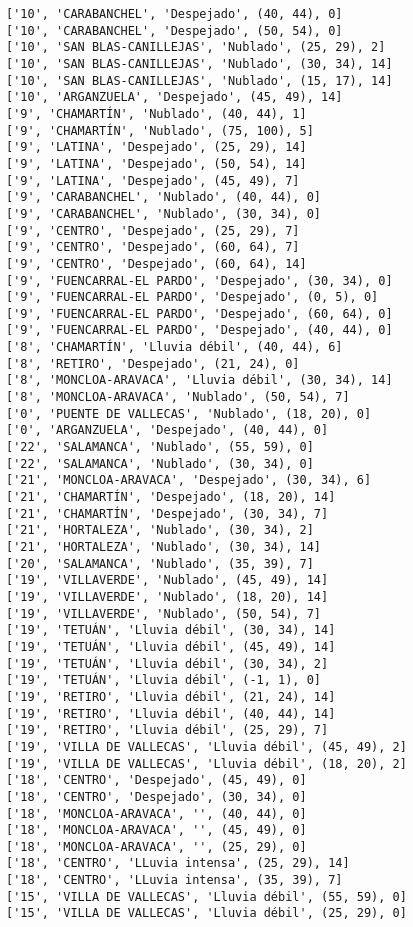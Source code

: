 \documentclass[11pt]{article}
\begin{document}
\begin{Verbatim}[commandchars=\\\{\}]
['10', 'CARABANCHEL', 'Despejado', (40, 44), 0]
['10', 'CARABANCHEL', 'Despejado', (50, 54), 0]
['10', 'SAN BLAS-CANILLEJAS', 'Nublado', (25, 29), 2]
['10', 'SAN BLAS-CANILLEJAS', 'Nublado', (30, 34), 14]
['10', 'SAN BLAS-CANILLEJAS', 'Nublado', (15, 17), 14]
['10', 'ARGANZUELA', 'Despejado', (45, 49), 14]
['9', 'CHAMARTÍN', 'Nublado', (40, 44), 1]
['9', 'CHAMARTÍN', 'Nublado', (75, 100), 5]
['9', 'LATINA', 'Despejado', (25, 29), 14]
['9', 'LATINA', 'Despejado', (50, 54), 14]
['9', 'LATINA', 'Despejado', (45, 49), 7]
['9', 'CARABANCHEL', 'Nublado', (40, 44), 0]
['9', 'CARABANCHEL', 'Nublado', (30, 34), 0]
['9', 'CENTRO', 'Despejado', (25, 29), 7]
['9', 'CENTRO', 'Despejado', (60, 64), 7]
['9', 'CENTRO', 'Despejado', (60, 64), 14]
['9', 'FUENCARRAL-EL PARDO', 'Despejado', (30, 34), 0]
['9', 'FUENCARRAL-EL PARDO', 'Despejado', (0, 5), 0]
['9', 'FUENCARRAL-EL PARDO', 'Despejado', (60, 64), 0]
['9', 'FUENCARRAL-EL PARDO', 'Despejado', (40, 44), 0]
['8', 'CHAMARTÍN', 'Lluvia débil', (40, 44), 6]
['8', 'RETIRO', 'Despejado', (21, 24), 0]
['8', 'MONCLOA-ARAVACA', 'Lluvia débil', (30, 34), 14]
['8', 'MONCLOA-ARAVACA', 'Nublado', (50, 54), 7]
['0', 'PUENTE DE VALLECAS', 'Nublado', (18, 20), 0]
['0', 'ARGANZUELA', 'Despejado', (40, 44), 0]
['22', 'SALAMANCA', 'Nublado', (55, 59), 0]
['22', 'SALAMANCA', 'Nublado', (30, 34), 0]
['21', 'MONCLOA-ARAVACA', 'Despejado', (30, 34), 6]
['21', 'CHAMARTÍN', 'Despejado', (18, 20), 14]
['21', 'CHAMARTÍN', 'Despejado', (30, 34), 7]
['21', 'HORTALEZA', 'Nublado', (30, 34), 2]
['21', 'HORTALEZA', 'Nublado', (30, 34), 14]
['20', 'SALAMANCA', 'Nublado', (35, 39), 7]
['19', 'VILLAVERDE', 'Nublado', (45, 49), 14]
['19', 'VILLAVERDE', 'Nublado', (18, 20), 14]
['19', 'VILLAVERDE', 'Nublado', (50, 54), 7]
['19', 'TETUÁN', 'Lluvia débil', (30, 34), 14]
['19', 'TETUÁN', 'Lluvia débil', (45, 49), 14]
['19', 'TETUÁN', 'Lluvia débil', (30, 34), 2]
['19', 'TETUÁN', 'Lluvia débil', (-1, 1), 0]
['19', 'RETIRO', 'Lluvia débil', (21, 24), 14]
['19', 'RETIRO', 'Lluvia débil', (40, 44), 14]
['19', 'RETIRO', 'Lluvia débil', (25, 29), 7]
['19', 'VILLA DE VALLECAS', 'Lluvia débil', (45, 49), 2]
['19', 'VILLA DE VALLECAS', 'Lluvia débil', (18, 20), 2]
['18', 'CENTRO', 'Despejado', (45, 49), 0]
['18', 'CENTRO', 'Despejado', (30, 34), 0]
['18', 'MONCLOA-ARAVACA', '', (40, 44), 0]
['18', 'MONCLOA-ARAVACA', '', (45, 49), 0]
['18', 'MONCLOA-ARAVACA', '', (25, 29), 0]
['18', 'CENTRO', 'LLuvia intensa', (25, 29), 14]
['18', 'CENTRO', 'LLuvia intensa', (35, 39), 7]
['15', 'VILLA DE VALLECAS', 'Lluvia débil', (55, 59), 0]
['15', 'VILLA DE VALLECAS', 'Lluvia débil', (25, 29), 0]

\end{Verbatim}
\end{document}
